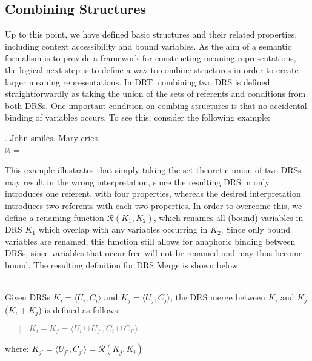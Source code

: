 \subsection{Combining Structures}

Up to this point, we have defined basic structures and their related
properties, including context accessibility and bound variables.  As the aim
of a semantic formalism is to provide a framework for constructing meaning
representations, the logical next step is to define a way to combine
structures in order to create larger meaning representations. In DRT,
combining two DRS is defined straightforwardly as taking the union of the
sets of referents and conditions from both DRSs. One important condition on
combing structures is that no accidental binding of variables occurs. To see
this, consider the following example:

\ex. John smiles. Mary cries.\\
   $\Cup$  = 

\noindent This example illustrates that simply taking the set-theoretic
union of two DRSs may result in the wrong interpretation, since the
resulting DRS in \Last only introduces one referent, with four properties,
whereas the desired interpretation introduces two referents with each two
properties. In order to overcome this, we define a renaming function
$\mathcal{R}(K_1,K_2)$, which renames all (bound) variables in DRS $K_1$
which overlap with any variables occurring in $K_2$. %
Since only bound variables are renamed, this function still allows for
anaphoric binding between DRSs, since variables that occur free will not be
renamed and may thus become bound. The resulting definition for DRS Merge is
shown below:

\begin{definition}\label{def:DRSmerge}~\\
Given DRSs $K_i=\langle U_i,C_i \rangle$ and $K_j=\langle U_j,C_j \rangle$,
the DRS merge between $K_i$ and $K_j$ ($K_i + K_j$) is defined as follows:
  \begin{quote}
    $K_i + K_j = 
    \langle U_i\cup U_{j'},C_i \cup C_{j'}\rangle$
  \end{quote}
  where: $K_{j'} = \langle U_{j'},C_{j'} \rangle = \mathcal{R}(K_j,K_i)$
\end{definition}


